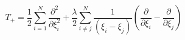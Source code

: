 \begin{equation}
	T_{+}=
	 \frac{1}{2} \sum_{i=1}^{N} \frac {\partial ^{2}}{\partial \xi_{i}^2} +
	\frac{\lambda}{2} \sum_{i\neq j}^{N} \frac {1}{(\xi_{i}-\xi_{j})}
	\left(
	\frac{\partial}{\partial \xi_{i}}-\frac {\partial}{\partial \xi_{j}}
	\right)
\end{equation}

